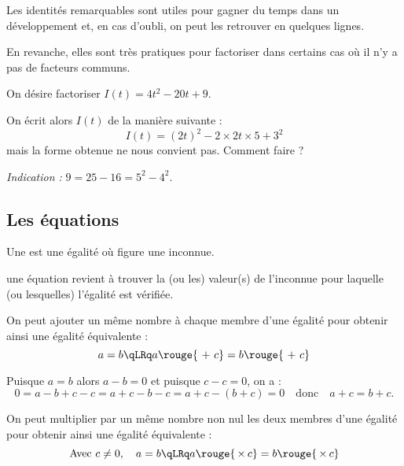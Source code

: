 \documentclass[10pt,openright,twoside,french]{book}
\begin{document}
\begin{Rmq}
    Les identités remarquables sont utiles pour gagner du temps dans un développement et, en cas d'oubli, on peut les retrouver en quelques lignes.\par
    En revanche, elles sont très pratiques pour factoriser dans certains cas où il n'y a pas de facteurs communs.
\end{Rmq} \medskip

\begin{Exemple}
    On désire factoriser $I(t) = 4t^2 - 20t + 9$.\par
    On écrit alors $I(t)$ de la manière suivante : \[I(t) = (2t)^2 - 2 \times 2t \times 5 + 3^2\] mais la forme obtenue ne nous convient pas. Comment faire ?\par
    \textit{Indication :} $9 = 25 - 16 = 5^2 - 4^2$.
\end{Exemple}

\subsection{Les équations}

\begin{Defi}
    Une  est une égalité où figure une inconnue.\par
     une équation revient à trouver la (ou les) valeur(s) de l'inconnue pour laquelle (ou lesquelles) l'égalité est vérifiée.
\end{Defi}\clearpage

\begin{Prop}
On peut ajouter un même nombre à chaque membre d'une égalité pour obtenir ainsi une égalité équivalente :
    \[a = b \qLRq a \rouge{\ +\ c } = b \rouge{\ +\ c}\]
\end{Prop}

\begin{Demo}
    Puisque $a = b$ alors $a - b = 0$ et puisque $c - c = 0$, on a :
    \[0 = a - b + c - c = a + c - b - c = a + c - (b + c) = 0 \quad \text{donc} \quad a+c = b+c.\]
\end{Demo}

\begin{Prop}
    On peut multiplier par un même nombre non nul les deux membres d'une égalité pour obtenir ainsi une égalité équivalente :
    \[\text{Avec } c\neq 0,\quad a = b \qLRq a \rouge{\,\times\,c} = b \rouge{\,\times\,c}\]
\end{Prop}
\end{document}
